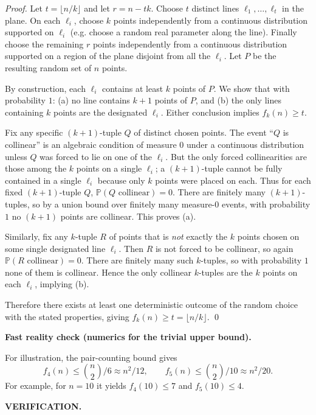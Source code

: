 \noindent\emph{Proof.}
Let $t=\lfloor n/k\rfloor$ and let $r=n-tk$.
Choose $t$ distinct lines $\ell_1,\dots,\ell_t$ in the plane.
On each $\ell_i$, choose $k$ points independently from a continuous distribution supported on $\ell_i$ (e.g. choose a random real parameter along the line).
Finally choose the remaining $r$ points independently from a continuous distribution supported on a region of the plane disjoint from all the $\ell_i$.
Let $P$ be the resulting random set of $n$ points.

By construction, each $\ell_i$ contains at least $k$ points of $P$.
We show that with probability $1$:
(a) no line contains $k+1$ points of $P$, and
(b) the only lines containing $k$ points are the designated $\ell_i$.
Either conclusion implies $f_k(n)\ge t$.

Fix any specific $(k+1)$-tuple $Q$ of distinct chosen points.
The event ``$Q$ is collinear'' is an algebraic condition of measure $0$ under a continuous distribution unless $Q$ was forced to lie on one of the $\ell_i$.
But the only forced collinearities are those among the $k$ points on a single $\ell_i$; a $(k+1)$-tuple cannot be fully contained in a single $\ell_i$ because only $k$ points were placed on each.
Thus for each fixed $(k+1)$-tuple $Q$, $\mathbb{P}(Q\text{ collinear})=0$.
There are finitely many $(k+1)$-tuples, so by a union bound over finitely many measure-$0$ events, with probability $1$ no $(k+1)$ points are collinear.
This proves (a).

Similarly, fix any $k$-tuple $R$ of points that is \emph{not} exactly the $k$ points chosen on some single designated line $\ell_i$.
Then $R$ is not forced to be collinear, so again $\mathbb{P}(R\text{ collinear})=0$.
There are finitely many such $k$-tuples, so with probability $1$ none of them is collinear.
Hence the only collinear $k$-tuples are the $k$ points on each $\ell_i$, implying (b).

Therefore there exists at least one deterministic outcome of the random choice with the stated properties, giving $f_k(n)\ge t=\lfloor n/k\rfloor$.
\qed

\bigskip
\noindent\textbf{Fast reality check (numerics for the trivial upper bound).}

For illustration, the pair-counting bound gives
\[f_4(n)\le \binom{n}{2}/6\approx n^2/12,\qquad f_5(n)\le \binom{n}{2}/10\approx n^2/20.\]
For example, for $n=10$ it yields $f_4(10)\le 7$ and $f_5(10)\le 4$.

\bigskip
\noindent\textbf{VERIFICATION.}

